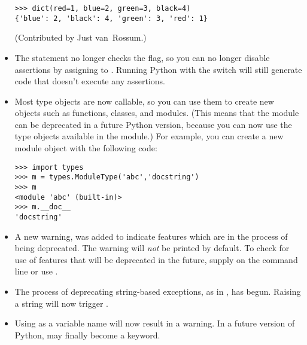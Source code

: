 \documentclass{howto}
\begin{document}
\begin{itemize}
\begin{verbatim}
>>> dict(red=1, blue=2, green=3, black=4)
{'blue': 2, 'black': 4, 'green': 3, 'red': 1}    
\end{verbatim}

(Contributed by Just van~Rossum.)       

\item The  statement no longer checks the 
flag, so you can no longer disable assertions by assigning to .
Running Python with the  switch will still generate
code that doesn't execute any assertions.

\item Most type objects are now callable, so you can use them
to create new objects such as functions, classes, and modules.  (This
means that the  module can be deprecated in a future
Python version, because you can now use the type objects available in
the  module.)
For example, you can create a new module object with the following code:

\begin{verbatim}
>>> import types
>>> m = types.ModuleType('abc','docstring')
>>> m
<module 'abc' (built-in)>
>>> m.__doc__
'docstring'
\end{verbatim}

\item
A new warning,  was added to
indicate features which are in the process of being
deprecated.  The warning will \emph{not} be printed by default.  To
check for use of features that will be deprecated in the future,
supply  on the
command line or use .

\item The process of deprecating string-based exceptions, as
in , has begun.  Raising a string will
now trigger .

\item Using  as a variable name will now result in a
 warning.  In a future version of Python,
 may finally become a keyword.


\end{itemize}
\end{document}
